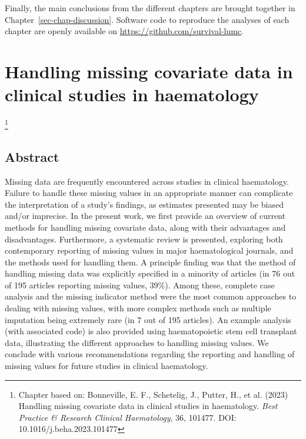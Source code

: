 \documentclass[
  letterpaper,
  paper=240mm:170mm,
  twoside=true,
  open=right,
  fontsize=10pt,
  pagesize=false,
  BCOR=15mm,
  DIV=14,
  headinclude=true,
  footinclude=false,
  headsepline=on]{scrbook}
\newcommand\blfootnote[1]{%
  \begingroup
  \renewcommand\thefootnote{}\footnote{#1}%
  \addtocounter{footnote}{-1}%
  \endgroup
}
\begin{document}
Finally, the main conclusions from the different chapters are brought
together in Chapter~\ref{sec-chap-discussion}. Software code to
reproduce the analyses of each chapter are openly available on
\url{https://github.com/survival-lumc}.


\chapter{Handling missing covariate data in clinical studies in
haematology}\label{sec-chap-haema-review}

\blfootnote{Chapter based on: Bonneville, E. F., Schetelig, J., Putter, H., et al. (2023) Handling missing covariate data in clinical studies in haematology. \textit{Best Practice \& Research Clinical Haematology}, 36, 101477. DOI: 10.1016/j.beha.2023.101477}

\clearpage

\section*{Abstract}\label{abstract}


Missing data are frequently encountered across studies in clinical
haematology. Failure to handle these missing values in an appropriate
manner can complicate the interpretation of a study's findings, as
estimates presented may be biased and/or imprecise. In the present work,
we first provide an overview of current methods for handling missing
covariate data, along with their advantages and disadvantages.
Furthermore, a systematic review is presented, exploring both
contemporary reporting of missing values in major haematological
journals, and the methods used for handling them. A principle finding
was that the method of handling missing data was explicitly specified in
a minority of articles (in 76 out of 195 articles reporting missing
values, 39\%). Among these, complete case analysis and the missing
indicator method were the most common approaches to dealing with missing
values, with more complex methods such as multiple imputation being
extremely rare (in 7 out of 195 articles). An example analysis (with
associated code) is also provided using haematopoietic stem cell
transplant data, illustrating the different approaches to handling
missing values. We conclude with various recommendations regarding the
reporting and handling of missing values for future studies in clinical
haematology.
\end{document}
